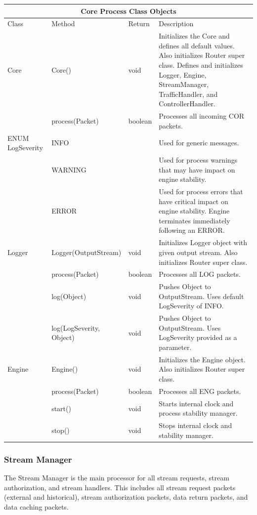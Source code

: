 \documentclass{article}
\begin{document}
\begin{center}
\begin{tabular}{ | p{3cm} || p{4cm} | p{2cm} | p{6cm} | }
\hline
\multicolumn{4}{|c|}{Core Process Class Objects}\\
\hline
Class & Method & Return & Description\\
\hline
Core & Core() & void & Initializes the Core and defines all default values. Also initializes Router super class. Defines and initializes Logger, Engine, StreamManager, TrafficHandler, and ControllerHandler.\\
 & process(Packet) & boolean & Processes all incoming COR packets.\\
\hline
ENUM LogSeverity & INFO &  & Used for generic messages.\\
 & WARNING &  & Used for process warnings that may have impact on engine stability.\\
 & ERROR &  & Used for process errors that have critical impact on engine stability. Engine terminates immediately following an ERROR.\\
\hline
Logger & Logger(OutputStream) & void & Initializes Logger object with given output stream. Also initializes Router super class.\\
 & process(Packet) & boolean & Processes all LOG packets.\\
 & log(Object) & void & Pushes Object to OutputStream. Uses default LogSeverity of INFO.\\
 & log(LogSeverity, Object) & void & Pushes Object to OutputStream. Uses LogSeverity provided as a parameter.\\
\hline
Engine & Engine() & void & Initializes the Engine object. Also initializes Router super class.\\
 & process(Packet) & boolean & Processes all ENG packets.\\
 & start() & void & Starts internal clock and process stability manager.\\
 & stop() & void & Stops internal clock and stability manager.\\
\hline
\end{tabular}
\end{center}

\cleardoublepage
\subsubsection{Stream Manager}
The Stream Manager is the main processor for all stream requests, stream authorization, and stream handlers. This includes all stream request packets (external and historical), stream authorization packets, data return packets, and data caching packets.
\end{document}
